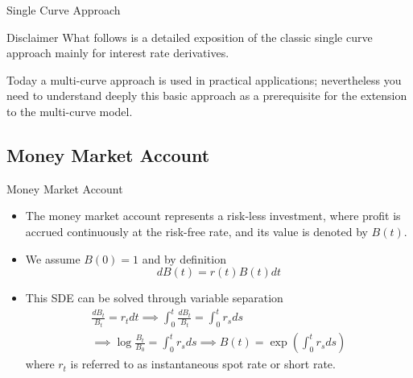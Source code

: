 \documentclass{beamer}
\begin{document}
	\begin{frame}{Single Curve Approach}
		\begin{block}{Disclaimer}
			What follows is a detailed exposition of the classic \textcolor{maincolor}{single curve} approach mainly for interest rate derivatives.

			Today a \textcolor{maincolor}{multi-curve approach} is
			used in practical applications; nevertheless you need to understand
			deeply this basic approach as a prerequisite for the extension to the
			multi-curve model.
		\end{block}
	\end{frame}

\subsection{Money Market Account}
\begin{frame}{Money Market Account}
	\begin{itemize}
		\item<0-> The \textcolor{maincolor}{money market account} represents a risk-less investment, where profit is accrued continuously at the risk-free rate, and its value is denoted by $B(t)$.
		\item<1-> We assume $B(0)=1$ and by definition
		\begin{equation}
			dB(t) = r(t)B(t)dt
		\end{equation}
		\item<2-> This SDE can be solved through variable separation
		\begin{equation}
			\begin{gathered}
				\frac{dB_t}{B_t} = r_t dt \implies \int_0^t \frac{dB_t}{B_t} = \int_0^t r_s ds \\
				\implies \log\frac{B_t}{B_0} = \int_0^t r_s ds \implies \boxed{B(t) = \exp\left(\int_0^t r_s ds\right)}
			\end{gathered}
		\end{equation}
		where $r_t$ is referred to as \textcolor{maincolor}{instantaneous spot rate} or \textcolor{maincolor}{short rate}.
	\end{itemize}
\end{frame}
\end{document}
